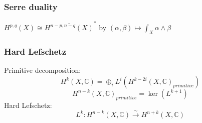 \documentclass{article}
\begin{document}
\subsubsection{Serre duality}
$ H^{p,q}(X)\cong \overline{H^{n-p,n-q}(X)}^{*} $ by $ (\alpha,\beta)\mapsto \int_{X}\alpha \wedge \beta $
\subsubsection{Hard Lefschetz}
Primitive decomposition:
\[
   H^{k}(X,\mathbb{C})= \oplus_{i}L^{i}(H^{k-2i}(X,\mathbb{C})_{primitive})
\]
\[
   H^{n-k}(X,\mathbb{C})_{primitive}= \operatorname{ker}(L^{k+1})
\]
Hard Lefschetz:
\[
  L^{k}:H^{n-k}(X,\mathbb{C})\xrightarrow{\sim}H^{n+k}(X,\mathbb{C}) 
\]
\end{document}
